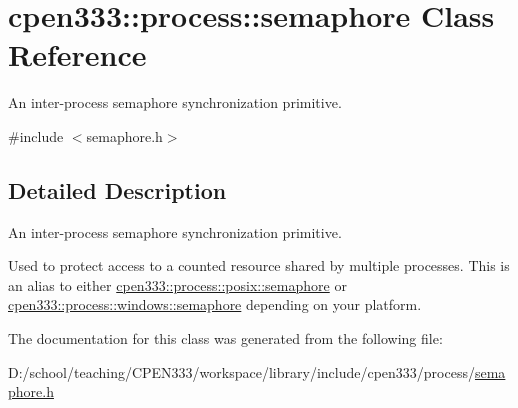 \hypertarget{classcpen333_1_1process_1_1semaphore}{}\section{cpen333\+:\+:process\+:\+:semaphore Class Reference}
\label{classcpen333_1_1process_1_1semaphore}


An inter-\/process semaphore synchronization primitive.  




{\ttfamily \#include $<$semaphore.\+h$>$}



\subsection{Detailed Description}
An inter-\/process semaphore synchronization primitive. 

Used to protect access to a counted resource shared by multiple processes. This is an alias to either \hyperlink{classcpen333_1_1process_1_1posix_1_1semaphore}{cpen333\+::process\+::posix\+::semaphore} or \hyperlink{classcpen333_1_1process_1_1windows_1_1semaphore}{cpen333\+::process\+::windows\+::semaphore} depending on your platform. 

The documentation for this class was generated from the following file\+:\begin{DoxyCompactItemize}
\item 
D\+:/school/teaching/\+C\+P\+E\+N333/workspace/library/include/cpen333/process/\hyperlink{process_2semaphore_8h}{semaphore.\+h}\end{DoxyCompactItemize}
